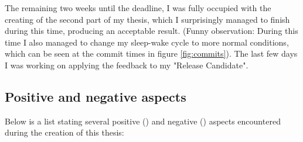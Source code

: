 The remaining two weeks until the deadline, I was fully occupied with the creating of the second part of my thesis, which I surprisingly managed to finish during this time, producing an acceptable result. (Funny observation: During this time I also managed to change my sleep-wake cycle to more normal conditions, which can be seen at the commit times in figure \ref{fig:commits}). The last few days I was working on applying the feedback to my "Release Candidate".

\pagebreak

\subsection{Positive and negative aspects}

\def\positive{\ding{51}}
\def\negative{\ding{55}}

Below is a list stating several positive (\positive) and negative (\negative) aspects encountered during the creation of this thesis:

